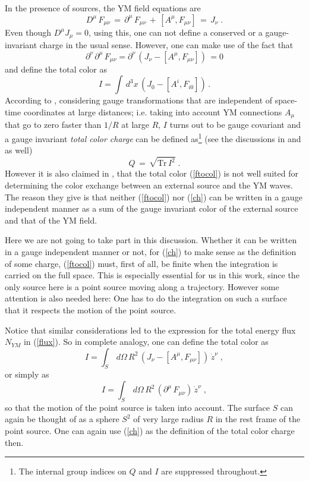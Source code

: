 \documentclass[a4paper,twocolumn,prd,showpacs,amsmath,amssymb]{revtex4}
\begin{document}
In the presence of sources, the YM field equations are
\begin{equation}
D^{\mu} \, F_{\mu\nu} \, = \, \partial^{\mu} \, F_{\mu\nu} \, +
\, [A^{\mu},F_{\mu\nu}] \, = \, J_{\nu} \; .
\label{symeq}
\end{equation}
Even though $D^{\mu} J_{\mu} = 0$, using this, one can not define a conserved or
a gauge-invariant charge in the usual sense. However, one can make use of the
fact that
\[ \partial^{\nu} \, \partial^{\mu} \, F_{\mu\nu} = \partial^{\nu} \,
(J_{\nu} - [A^{\mu},F_{\mu\nu}] ) \, = 0 \]
and define the total color as
\begin{equation}
I = \int \, d^3x \, (J_{0} - [A^{i},F_{i0}]) \, .
\label{ftocol}
\end{equation}
According to \cite{olt}, considering gauge transformations that are independent
of space-time coordinates at large distances; i.e. taking into account YM
connections $A_{\mu}$ that go to zero faster than $1/R$ at large $R$, $I$ turns
out to be gauge covariant and a gauge invariant {\it total color charge} can be defined
as\footnote{The internal group indices on $Q$ and $I$ are suppressed throughout.}
(see the discussions in \cite{tt} and \cite{olt} as well)
\begin{equation}
Q \, = \, \sqrt{\mbox{Tr} \, I^2} \; .
\label{ch}
\end{equation}
However it is also claimed in \cite{lo}, \cite{olt} that the total color
(\ref{ftocol}) is not well suited for determining the color exchange between
an external source and the YM waves. The reason they give is that neither
(\ref{ftocol}) nor (\ref{ch}) can be written in a gauge independent manner
as a sum of the gauge invariant color of the external source and that of the
YM field.

Here we are not going to take part in this discussion. Whether it can
be written in a gauge independent manner or not, for (\ref{ch}) to make sense
as the definition of some charge, (\ref{ftocol}) must, first of all, be finite
when the integration is carried on the full space. This is especially essential
for us in this work, since the only source here is a point source moving along a
trajectory. However some attention is also needed here: One has to do the
integration on such a surface that it respects the motion of the point source.

Notice that similar considerations led \cite{bar} to the expression for the
total energy flux $N_{YM}$ in (\ref{flux}). So in complete analogy, one can
define the total color as
\begin{equation}
I = \int_{S} \, d\Omega \, R^2 \, (J_{\nu} - [A^{\mu},F_{\mu\nu}]) \, \dot{z}^{\nu} \; ,
\label{stocol}
\end{equation}
or simply as
\begin{equation}
I = \int_{S} \, d\Omega \, R^2 \, (\partial^{\mu} \, F_{\mu\nu}) \, \dot{z}^{\nu} \; ,
\label{tocol}
\end{equation}
so that the motion of the point source is taken into account. The surface $S$ can
again be thought of as a sphere $S^2$ of very large radius $R$ in the rest frame
of the point source. One can again use (\ref{ch}) as the definition of the total
color charge then.
\end{document}
